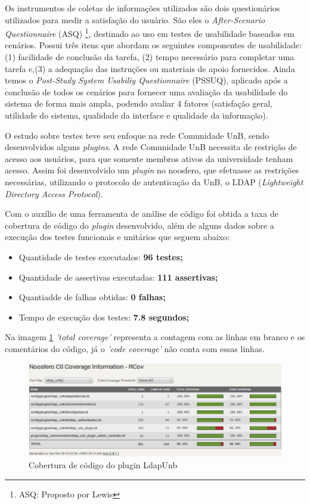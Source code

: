 Os instrumentos de coletas de informações utilizados são dois questionários utilizados para medir a satisfação do usuário.
%
São eles o \textit{After-Scenario Questionnaire} (ASQ) \footnote{ASQ: Proposto por Lewis}, destinado ao uso em testes de usabilidade baseados em cenários. Possui três itens que abordam os seguintes componentes de usabilidade: (1) facilidade de conclusão da tarefa, (2) tempo necessário para completar uma tarefa e,(3) a adequação das instruções ou materiais de apoio fornecidos. Ainda temos o \textit{Post-Study System Usabiliy Questionnaire} (PSSUQ), aplicado após a conclusão de todos os cenários para fornecer uma avaliação  da usabilidade do sistema de forma mais ampla, podendo avaliar 4 fatores (satisfação geral, utilidade do sistema, qualidade da interface e qualidade da informação). 


O estudo sobre testes teve seu enfoque na rede Comunidade UnB, sendo desenvolvidos alguns \textit{plugins}. A rede Comunidade UnB 
necessita de restrição de acesso aos usuários, para que somente membros ativos da universidade tenham acesso. 
%
Assim foi desenvolvido um \textit{plugin} no noosfero, que efetuasse as restrições necessárias, utilizando o protocolo de autenticação da UnB, o LDAP (\textit{Lightweight Directory Access Protocol}).

Com o auxílio de uma ferramenta de análise de código foi obtida a taxa de cobertura de código do \textit{plugin} desenvolvido, além de alguns dados sobre a execução dos testes funcionais e unitários que seguem abaixo:

\begin{itemize}
\item Quantidade de testes executados: \textbf{96 testes;}
\item Quantidade de assertivas executadas: \textbf{111 assertivas;}
\item Quantiadde de falhas obtidas: \textbf{0 falhas;}
\item Tempo de execução dos testes: \textbf{7.8 segundos;}
\end{itemize}

Na imagem \ref{consideracoes_cobertura1} \textit{'total coverage'} representa a contagem com as linhas em branco e os comentários do código, já o \textit{'code coverage'} não conta com essas linhas.


\begin{figure}[!h]
    \centering
    \includegraphics[keepaspectratio=false,scale=0.45]
      {images/cobertura_teste.eps}
    \caption{Cobertura de código do plugin LdapUnb}
    \label{consideracoes_cobertura1}
\end{figure}

